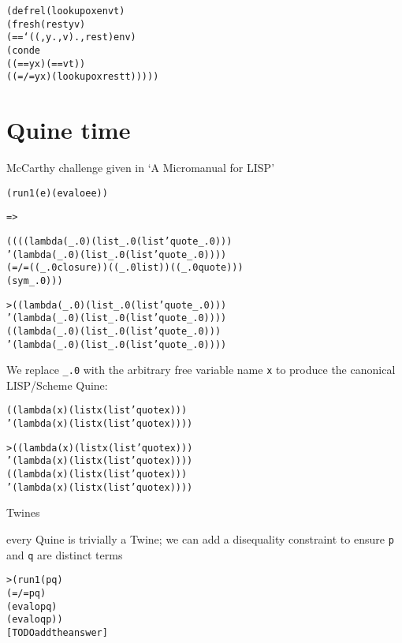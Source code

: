 \documentclass{book}
\begin{document}
\begin{alltt}
(defrel (lookupo x env t)
  (fresh (rest y v)
    (== `((,y . ,v) . ,rest) env)
    (conde
      ((== y x) (== v t))
      ((=/= y x) (lookupo x rest t)))))
\end{alltt}



\chapter{Quine time}%

McCarthy challenge given in `A Micromanual for LISP'

\begin{alltt}
(run 1 (e) (evalo e e))
\end{alltt}
\verb|=>|
\begin{alltt}
((((lambda (_.0) (list _.0 (list 'quote _.0)))
   '(lambda (_.0) (list _.0 (list 'quote _.0))))
  (=/= ((_.0 closure)) ((_.0 list)) ((_.0 quote)))
  (sym _.0)))
\end{alltt}

\begin{alltt}
> ((lambda (_.0) (list _.0 (list 'quote _.0)))
    '(lambda (_.0) (list _.0 (list 'quote _.0))))
((lambda (_.0) (list _.0 (list 'quote _.0)))
  '(lambda (_.0) (list _.0 (list 'quote _.0))))
\end{alltt}

We replace \verb|_.0| with the arbitrary free variable name \verb|x| to produce the canonical LISP/Scheme Quine:

\begin{alltt}
((lambda (x) (list x (list 'quote x)))
 '(lambda (x) (list x (list 'quote x))))
\end{alltt}

\begin{alltt}
> ((lambda (x) (list x (list 'quote x)))
   '(lambda (x) (list x (list 'quote x))))
((lambda (x) (list x (list 'quote x)))
  '(lambda (x) (list x (list 'quote x))))
\end{alltt}

Twines

every Quine is trivially a Twine; we can add a disequality constraint to ensure \verb|p| and \verb|q| are distinct terms

\begin{alltt}
> (run 1 (p q)
    (=/= p q)
    (evalo p q)
    (evalo q p))
[TODO add the answer]
\end{alltt}
\end{document}
